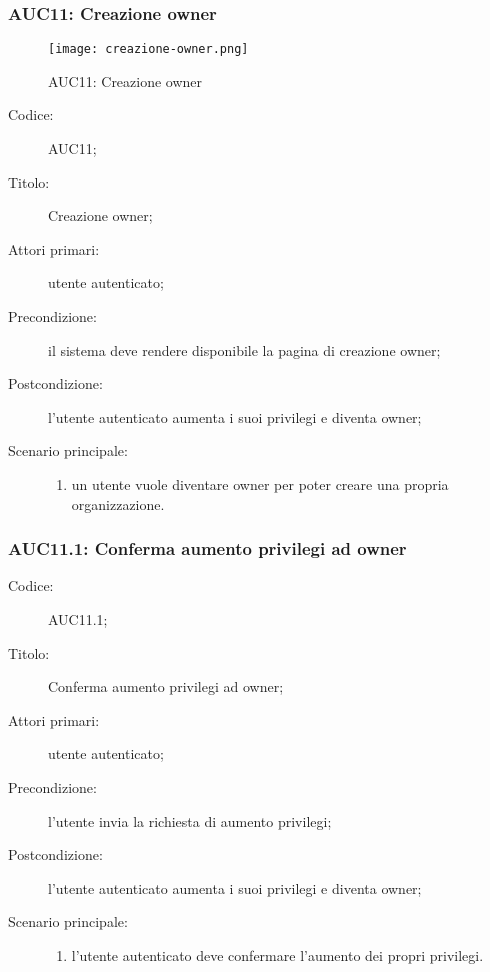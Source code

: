\documentclass[../../../analisi-dei-requisiti.tex]{subfiles}
\begin{document}
\subsubsection{AUC11: Creazione owner}%
\label{subs:AUC11}

\begin{figure}[H]
  \centering
  \texttt{[image: creazione-owner.png]}
  \caption{AUC11: Creazione owner}%
  \label{fig:AUC11}
\end{figure}

\begin{description}
  \item[Codice:] AUC11;
  \item[Titolo:] Creazione owner;
  \item[Attori primari:] utente autenticato;
  \item[Precondizione:] il sistema deve rendere disponibile la pagina di creazione owner;
  \item[Postcondizione:] l'utente autenticato aumenta i suoi privilegi e diventa owner;
  \item[Scenario principale:]
  \begin{enumerate}
    \item un utente vuole diventare owner per poter creare una propria organizzazione.
  \end{enumerate}
\end{description}

\subsubsection{AUC11.1: Conferma aumento privilegi ad owner}%
\label{subs:AUC11.1}
\begin{description}
  \item[Codice:] AUC11.1;
  \item[Titolo:] Conferma aumento privilegi ad owner;
  \item[Attori primari:] utente autenticato;
  \item[Precondizione:] l'utente invia la richiesta di aumento privilegi;
  \item[Postcondizione:] l'utente autenticato aumenta i suoi privilegi e diventa owner;
  \item[Scenario principale:]
  \begin{enumerate}
    \item l'utente autenticato deve confermare l'aumento dei propri privilegi.
  \end{enumerate}
\end{description}
\end{document}
